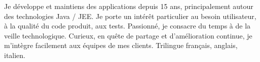 

\begin{cvparagraph}

Je développe et maintiens des applications depuis 15 ans, principalement autour des technologies Java / JEE. Je porte un intérêt particulier au besoin utilisateur, à la qualité du code produit, aux tests. Passionné, je consacre du temps à de la veille technologique. Curieux, en quête de partage et d'amélioration continue, je m'intègre facilement aux équipes de mes clients. Trilingue français, anglais, italien.
\end{cvparagraph}
